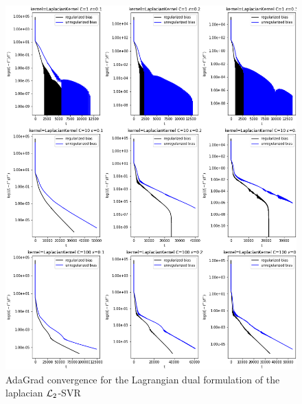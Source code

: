 

\begin{figure}[H]
	\centering
	\includegraphics[scale=0.55]{img/laplacian_lagrangian_dual_l2_svr_loss_history}
	\caption{AdaGrad convergence for the Lagrangian dual formulation of the laplacian $\protect \mathcal{L}_2$-SVR}
	\label{fig:laplacian_lagrangian_dual_l2_svr_loss_history}
\end{figure}

